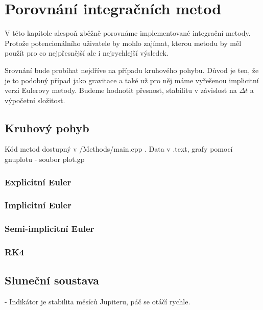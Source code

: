 \chapter{Porovnání integračních metod}
V této kapitole alespoň zběžně porovnáme implementované integrační metody. Protože potencionálního uživatele by mohlo zajímat, kterou metodu by měl použít pro co nejpřesnější ale i nejrychlejší výsledek.

Srovnání bude probíhat nejdříve na případu kruhového pohybu. Důvod je ten, že je to podobný případ jako gravitace a také už pro něj máme vyřešenou implicitní verzi Eulerovy metody. Budeme hodnotit přesnost, stabilitu v závislost na $ \Delta t $ a výpočetní složitost.

\section{Kruhový pohyb}
Kód metod dostupný v /Methods/main.cpp . Data v .text, grafy pomocí gnuplotu - soubor plot.gp
\subsection{Explicitní Euler}
\subsection{Implicitní Euler}
\subsection{Semi-implicitní Euler}
\subsection{RK4}
\section{Sluneční soustava}
- Indikátor je stabilita měsíců Jupiteru, páč se otáčí rychle.